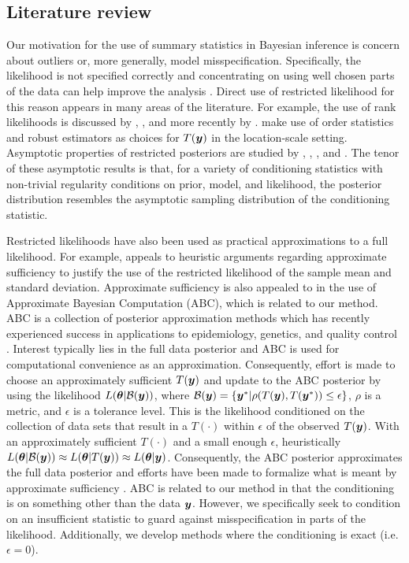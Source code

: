 \documentclass[ba]{imsart}
\def\bth{\mbox{\boldmath $\theta$}}
\newcommand{\by}{\mbox{\boldmath $y$}}
\begin{document}
\subsection{Literature review}

Our motivation for the use of summary statistics in Bayesian inference is concern about outliers or, more generally, model misspecification. Specifically, the likelihood is not specified correctly and concentrating on using well chosen parts of the data can help improve the analysis \citep[e.g.,][]{wong2004}. Direct use of restricted likelihood for this reason appears in many areas of the literature.  For example, the use of rank likelihoods is discussed by \cite{savage1969}, \cite{pettitt1983, pettitt1982}, and more recently by \cite{hoff2013}.  
\cite{lewis2012} make use of order statistics and robust estimators as choices for $T(\by)$ in the location-scale setting. 
Asymptotic properties of restricted posteriors are studied by \cite{doksum1990}, \cite{clarke1995}, \cite{yuan2004},  and \cite{hwang2005}. The tenor of these asymptotic results is that, for a variety of conditioning statistics with non-trivial regularity conditions on prior, model, and likelihood, the
posterior distribution resembles the asymptotic sampling distribution of the conditioning statistic.  

Restricted likelihoods have also been used as practical approximations to a full likelihood. For example, \cite{pratt1965} appeals to heuristic arguments regarding approximate sufficiency to justify the use of the restricted likelihood of the sample mean and standard deviation. Approximate sufficiency is also appealed to in the use of Approximate Bayesian Computation (ABC), which is related to our method.  
ABC is a collection of posterior approximation methods which has recently experienced success in applications to epidemiology, genetics, and quality control \citep[see, for example,][]{tavare1997, pritchard1999,  marjoram2003, fearnhead2012}. Interest typically lies in the full data posterior and ABC is used for computational convenience as an approximation.  Consequently, effort is made to choose an approximately sufficient $T(\by)$ and update to the ABC posterior by using the likelihood $L(\bth| \mathcal{B}(\by))$, where $\mathcal{B}(\by)=\{\by^{*}|\rho(T(\by),T(\by^{*})) \leq \epsilon\}$, $\rho$ is a metric, and $\epsilon$ is a tolerance level. This is the likelihood conditioned on the collection of data sets that result in a $T(\cdot)$ within $\epsilon$ of the observed $T(\by)$. %
With an approximately sufficient $T(\cdot)$ and a small enough $\epsilon$, heuristically  $L(\bth|\mathcal{B}(\by))\approx L(\bth|T(\by))\approx L(\bth|\by)$. Consequently, the ABC posterior approximates the full data posterior and efforts have been made to formalize what is meant by  approximate sufficiency \citep[e.g.,][]{joyce2008}. ABC is related to our method in that the conditioning is on something other than the data $\by$.  However, we specifically seek to condition on an insufficient statistic to guard against misspecification in parts of the likelihood. Additionally, we develop methods where the conditioning is exact (i.e. $\epsilon = 0$).
\end{document}
